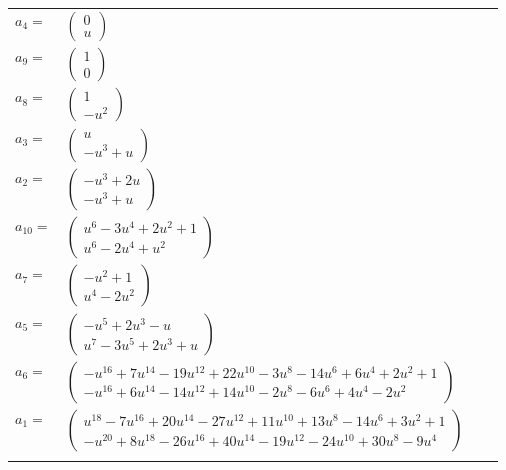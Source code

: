 \documentclass[1p]{elsarticle_modified}
\theoremstyle{definition}
\begin{document}
\begin{tabular}{m{7pt} m{180pt} m{7pt} m{180pt} }
\flushright $a_{4}=$&$\begin{pmatrix}0\\u\end{pmatrix}$ \\
\flushright $a_{9}=$&$\begin{pmatrix}1\\0\end{pmatrix}$ \\
\flushright $a_{8}=$&$\begin{pmatrix}1\\- u^2\end{pmatrix}$ \\
\flushright $a_{3}=$&$\begin{pmatrix}u\\- u^3+u\end{pmatrix}$ \\
\flushright $a_{2}=$&$\begin{pmatrix}- u^3+2 u\\- u^3+u\end{pmatrix}$ \\
\flushright $a_{10}=$&$\begin{pmatrix}u^6-3 u^4+2 u^2+1\\u^6-2 u^4+u^2\end{pmatrix}$ \\
\flushright $a_{7}=$&$\begin{pmatrix}- u^2+1\\u^4-2 u^2\end{pmatrix}$ \\
\flushright $a_{5}=$&$\begin{pmatrix}- u^5+2 u^3- u\\u^7-3 u^5+2 u^3+u\end{pmatrix}$ \\
\flushright $a_{6}=$&$\begin{pmatrix}- u^{16}+7 u^{14}-19 u^{12}+22 u^{10}-3 u^8-14 u^6+6 u^4+2 u^2+1\\- u^{16}+6 u^{14}-14 u^{12}+14 u^{10}-2 u^8-6 u^6+4 u^4-2 u^2\end{pmatrix}$ \\
\flushright $a_{1}=$&$\begin{pmatrix}u^{18}-7 u^{16}+20 u^{14}-27 u^{12}+11 u^{10}+13 u^8-14 u^6+3 u^2+1\\- u^{20}+8 u^{18}-26 u^{16}+40 u^{14}-19 u^{12}-24 u^{10}+30 u^8-9 u^4\end{pmatrix}$\\&\end{tabular}
\end{document}

